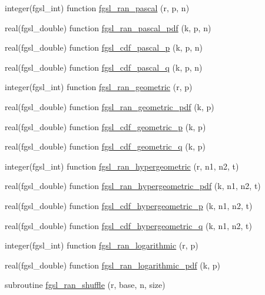 \begin{DoxyCompactItemize}
\item 
integer(fgsl\-\_\-int) function \hyperlink{rng_8finc_a0027f47bae46e3f5160056c4a0f0bb16}{fgsl\-\_\-ran\-\_\-pascal} (r, p, n)
\item 
real(fgsl\-\_\-double) function \hyperlink{rng_8finc_a1c7effe4be2e34250060a625e3787d84}{fgsl\-\_\-ran\-\_\-pascal\-\_\-pdf} (k, p, n)
\item 
real(fgsl\-\_\-double) function \hyperlink{rng_8finc_a064c1823c11347b4746af47bec4ac6cd}{fgsl\-\_\-cdf\-\_\-pascal\-\_\-p} (k, p, n)
\item 
real(fgsl\-\_\-double) function \hyperlink{rng_8finc_a5635e95d11c8e3cd9d0a8ecb58d45987}{fgsl\-\_\-cdf\-\_\-pascal\-\_\-q} (k, p, n)
\item 
integer(fgsl\-\_\-int) function \hyperlink{rng_8finc_ae482dfe1c492849cb92416b03115b90e}{fgsl\-\_\-ran\-\_\-geometric} (r, p)
\item 
real(fgsl\-\_\-double) function \hyperlink{rng_8finc_ad9e7f55be1f69e7b25a9e65a40708cec}{fgsl\-\_\-ran\-\_\-geometric\-\_\-pdf} (k, p)
\item 
real(fgsl\-\_\-double) function \hyperlink{rng_8finc_a4a120f9eb0d44094801ba645513a989f}{fgsl\-\_\-cdf\-\_\-geometric\-\_\-p} (k, p)
\item 
real(fgsl\-\_\-double) function \hyperlink{rng_8finc_a4aebfe7d978d88066a79acaa75308f22}{fgsl\-\_\-cdf\-\_\-geometric\-\_\-q} (k, p)
\item 
integer(fgsl\-\_\-int) function \hyperlink{rng_8finc_a555f87a230be607e1cd924efad37bbda}{fgsl\-\_\-ran\-\_\-hypergeometric} (r, n1, n2, t)
\item 
real(fgsl\-\_\-double) function \hyperlink{rng_8finc_a7d562f6070fb8375424c9bb8002102ee}{fgsl\-\_\-ran\-\_\-hypergeometric\-\_\-pdf} (k, n1, n2, t)
\item 
real(fgsl\-\_\-double) function \hyperlink{rng_8finc_ad32c3936baaedfa550d4b8290fdd6a3d}{fgsl\-\_\-cdf\-\_\-hypergeometric\-\_\-p} (k, n1, n2, t)
\item 
real(fgsl\-\_\-double) function \hyperlink{rng_8finc_aa84f12c0e14bb16890138becd9def9c4}{fgsl\-\_\-cdf\-\_\-hypergeometric\-\_\-q} (k, n1, n2, t)
\item 
integer(fgsl\-\_\-int) function \hyperlink{rng_8finc_a584f76adbf187041b73db1c34576f40c}{fgsl\-\_\-ran\-\_\-logarithmic} (r, p)
\item 
real(fgsl\-\_\-double) function \hyperlink{rng_8finc_a8ac180ac52e5466637bbbf1161289f49}{fgsl\-\_\-ran\-\_\-logarithmic\-\_\-pdf} (k, p)
\item 
subroutine \hyperlink{rng_8finc_aaaec4c2b90a22f0b1d7006fba9b349ef}{fgsl\-\_\-ran\-\_\-shuffle} (r, base, n, size)

\end{DoxyCompactItemize}
